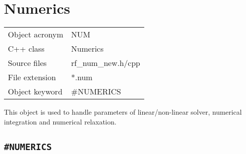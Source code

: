 \section{Numerics}

\begin{tabular*}{8.35cm}{|p{2.5cm}|p{5cm}|} \hline
Object acronym & NUM \\
C++ class      & Numerics \\
Source files   & rf\_num\_new.h/cpp \\
\hline
File extension & *.num \\
Object keyword & \#NUMERICS \\
\hline
\end{tabular*}

This object is used to handle parameters of linear/non-linear solver, numerical integration
 and numerical relaxation.
\subsection{\texttt{\bf\#NUMERICS}}


